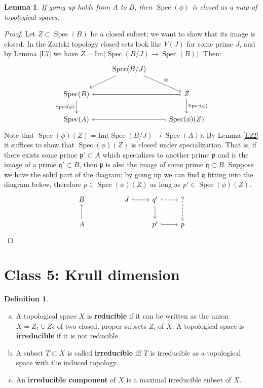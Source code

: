 \documentclass{article}
\newcommand{\fr}{\mathfrak}
\DeclareMathOperator{\Spec}{Spec}
\theoremstyle{plain}
\newtheorem{lem}[thm]{Lemma}
\theoremstyle{definition}
\newtheorem{defn}{Definition}
\theoremstyle{remark}
\begin{document}
\begin{lem}
\label{L23}
If going up holds from $A$ to $B$, then $\Spec(\phi)$ is closed as a map of topological spaces.
\end{lem}
\begin{proof}
Let $Z\subset \Spec(B)$ be a closed subset; we want to show that its image is closed. In the Zariski topology closed sets look like $V(J)$ for some prime $J$, and by Lemma \ref{L7} we have $Z = \text{Im} \big(\Spec(B/J) \to \Spec(B) \big)$. Then:
\[
\begin{tikzcd}
    {}& \Spec(B/J)\arrow{dl}\arrow{dr}{\cong} & \\
\Spec(B)\arrow{d}[swap]{\Spec(\phi)} & & Z\arrow{d}{\Spec(\phi)}\arrow[hook]{ll} \\
\Spec(A) & & \Spec(\phi)(Z) \arrow[hook]{ll}
\end{tikzcd}
\]
Note that $\Spec(\phi)(Z) = \text{Im}\big(\Spec(B/J) \to \Spec(A)\big)$. By Lemma \ref{L22} it suffices to show that $\Spec(\phi)(Z)$ is closed under specialization. That is, if there exists some prime $\fr p' \subset A$ which specializes to another prime $\fr p$ and is the image of a prime $\fr q' \subset B$, then $\fr p$ is also the image of some prime $\fr q \subset B$. Suppose we have the solid part of the diagram; by going up we can find $\fr q$ fitting into the diagram below, therefore $p\in \Spec(\phi)(Z)$ as long as $p' \in \Spec(\phi)(Z)$.
\[
\begin{tikzcd}
B & & J\arrow[hook]{r} & q'\arrow{d}\arrow[dashed, hook]{r} & ?\arrow[dashed]{d} \\
A\arrow{u} & &   & p'\arrow[hook]{r} & p
\end{tikzcd}
\]
\end{proof}


\section*{Class 5: Krull dimension}

\begin{defn}\hspace{1mm}
\begin{enumerate}[(a)]
\item A topological space $X$ is \textbf{reducible} if it can be written as the union $X=Z_1\cup Z_2$ of two closed, proper subsets $Z_i$ of $X$. A topological space is \textbf{irreducible} if it is not reducible.
\item A subset $T\subset X$ is called \textbf{irreducible} iff $T$ is irreducible as a topological space with the induced topology.
\item An \textbf{irreducible component} of $X$ is a maximal irreducible subset of $X$.
\end{enumerate}
\end{defn}
\end{document}
